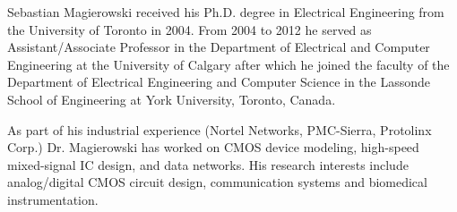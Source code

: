\documentclass[journal]{IEEEtran}
\begin{document}
\vspace{-0.5in}
\begin{IEEEbiography}
{Sebastian Magierowski} received his Ph.D. degree in Electrical Engineering from the University of Toronto in 2004.  From 2004 to 2012 he served as Assistant/Associate Professor in the Department of Electrical and Computer Engineering at the University of Calgary after which he joined the faculty of the Department of Electrical Engineering and Computer Science in the Lassonde School of Engineering at York University, Toronto, Canada.  

As part of his industrial experience (Nortel Networks, PMC-Sierra, Protolinx Corp.) Dr. Magierowski has worked on CMOS device modeling, high-speed mixed-signal IC design, and data networks.  His research interests include analog/digital CMOS circuit design, communication systems and biomedical instrumentation.
\end{IEEEbiography}
\end{document}
